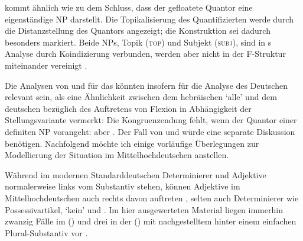 \citet[533--534]{spector2009} kommt ähnlich wie \citet[29]{pittner1995} zu dem
Schluss, dass der gefloatete Quantor eine eigenständige NP darstellt. Die
Topikalisierung des Quantifizierten werde durch die Distanzstellung des
Quantors angezeigt; die Konstruktion sei dadurch besonders markiert. Beide NPs,
Topik (\textsc{top}) und Subjekt (\textsc{subj}), sind in
\citeauthor{spector2009}s Analyse durch Koindizierung verbunden, werden aber
nicht in der F-Struktur miteinander vereinigt
\autocite[vgl.][99]{bresnanetal2016}.

Die Analysen von \citet{shlonsky1991} und \citet{spector2009} für das
 könnten insofern für die Analyse des Deutschen
relevant sein, als \citet[179]{merchant1996} eine Ähnlichkeit zwischen dem
hebräischen  `alle' und dem deutschen
 bezüglich des Auftretens von Flexion in Abhängigkeit der
Stellungsvariante vermerkt: Die Kongruenzendung fehlt, wenn der Quantor einer
definiten NP vorangeht:  aber . Der Fall von  und  würde eine separate Diskussion benötigen.
Nachfolgend möchte ich einige vorläufige Überlegungen zur Modellierung der
Situation im Mittelhochdeutschen anstellen.

Während im modernen Standarddeutschen Determinierer und
Adjektive normalerweise links vom Substantiv stehen,
können Adjektive im Mittelhochdeutschen auch rechts davon
auftreten \autocite[185--186, 237--243]{ksw2}, selten auch Determinierer wie
Possessivartikel,  `kein' und 
\autocite[515--517, 551--552, 623--624]{ksw2}. Im hier ausgewerteten Material
liegen immerhin zwanzig Fälle im 
(\CAO) und drei in der  (\KC) mit nachgestelltem
 hinter einem einfachen Plural-Substantiv vor
.



